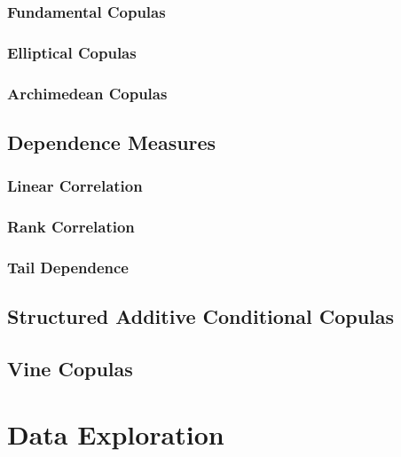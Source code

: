 \documentclass[11pt, twoside]{article}
\numberwithin{equation}{section}
\numberwithin{table}{section}
\numberwithin{figure}{section}
\begin{document}
\subsubsection{Fundamental Copulas} \label{sssec:fundamental_copulas}

\subsubsection{Elliptical Copulas} \label{sssec:elliptical_copulas}

\subsubsection{Archimedean Copulas} \label{sssec:archimedean_copulas}

\subsection{Dependence Measures} \label{ssec:dependence_measures}

\subsubsection{Linear Correlation} \label{sssec:linear_correlation}

\subsubsection{Rank Correlation} \label{sssec:rank_correlation}

\subsubsection{Tail Dependence} \label{sssec:tail_dependence}

\subsection{Structured Additive Conditional Copulas} \label{ssec:conditional_copulas}

\subsection{Vine Copulas} \label{ssec:vine_copulas}

\newpage
\thispagestyle{empty}
\cleardoublepage


\thispagestyle{plain}
\section{Data Exploration} \label{sec:data_exploration}

\end{document}
